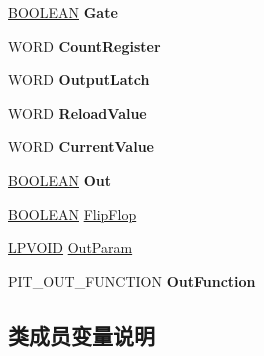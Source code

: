 \begin{DoxyCompactItemize}
\hyperlink{_processor_bind_8h_a112e3146cb38b6ee95e64d85842e380a}{B\+O\+O\+L\+E\+AN} {\bfseries Gate}
\item 
\mbox{\label{struct___p_i_t___c_h_a_n_n_e_l_a8b9973df9262d96ca16e9c484ba87523}} 
W\+O\+RD {\bfseries Count\+Register}
\item 
\mbox{\label{struct___p_i_t___c_h_a_n_n_e_l_ad603e2967a8ab3d7fc1d44e68c1fbba8}} 
W\+O\+RD {\bfseries Output\+Latch}
\item 
\mbox{\label{struct___p_i_t___c_h_a_n_n_e_l_a502b810f234beffeace245c1b4cfea43}} 
W\+O\+RD {\bfseries Reload\+Value}
\item 
\mbox{\label{struct___p_i_t___c_h_a_n_n_e_l_ac7beacb277d75932ce43fc393dfcf180}} 
W\+O\+RD {\bfseries Current\+Value}
\item 
\mbox{\label{struct___p_i_t___c_h_a_n_n_e_l_add29bf721a50fcc7fc51f575a7c2afea}} 
\hyperlink{_processor_bind_8h_a112e3146cb38b6ee95e64d85842e380a}{B\+O\+O\+L\+E\+AN} {\bfseries Out}
\item 
\hyperlink{_processor_bind_8h_a112e3146cb38b6ee95e64d85842e380a}{B\+O\+O\+L\+E\+AN} \hyperlink{struct___p_i_t___c_h_a_n_n_e_l_ac82ab6441bdcbd92623abb2e1cd8834a}{Flip\+Flop}
\item 
\hyperlink{interfacevoid}{L\+P\+V\+O\+ID} \hyperlink{struct___p_i_t___c_h_a_n_n_e_l_ad0057c56996469933a0d5949d0f39442}{Out\+Param}
\item 
\mbox{\label{struct___p_i_t___c_h_a_n_n_e_l_a6fa9f9afb6fe04c0ce67db5c3ed54e35}} 
P\+I\+T\+\_\+\+O\+U\+T\+\_\+\+F\+U\+N\+C\+T\+I\+ON {\bfseries Out\+Function}
\end{DoxyCompactItemize}


\subsection{类成员变量说明}
\mbox{\label{struct___p_i_t___c_h_a_n_n_e_l_ac82ab6441bdcbd92623abb2e1cd8834a}} 
